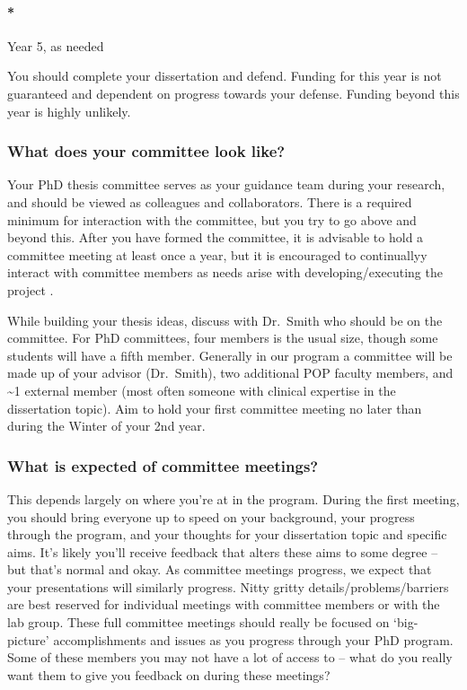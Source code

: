 \documentclass[
  letterpaper,
  DIV=11,
  numbers=noendperiod]{scrreprt}
\let\oldparagraph\paragraph
\renewcommand{\paragraph}[1]{\oldparagraph{#1}\mbox{}}
\begin{document}
\hypertarget{year-5-as-needed}{%
\paragraph*{Year 5, as needed}\label{year-5-as-needed}}

You should complete your dissertation and defend. Funding for this year
is not guaranteed and dependent on progress towards your defense.
Funding beyond this year is highly unlikely.

\hypertarget{what-does-your-committee-look-like}{%
\subsubsection{What does your committee look
like?}\label{what-does-your-committee-look-like}}

Your PhD thesis committee serves as your guidance team during your
research, and should be viewed as colleagues and collaborators. There is
a required minimum for interaction with the committee, but you try to go
above and beyond this. After you have formed the committee, it is
advisable to hold a committee meeting at least once a year, but it is
encouraged to continuallyy interact with committee members as needs
arise with developing/executing the project .

While building your thesis ideas, discuss with Dr.~Smith who should be
on the committee. For PhD committees, four members is the usual size,
though some students will have a fifth member. Generally in our program
a committee will be made up of your advisor (Dr.~Smith), two additional
POP faculty members, and \textasciitilde1 external member (most often
someone with clinical expertise in the dissertation topic). Aim to hold
your first committee meeting no later than during the Winter of your 2nd
year.

\hypertarget{what-is-expected-of-committee-meetings}{%
\subsubsection{What is expected of committee
meetings?}\label{what-is-expected-of-committee-meetings}}

This depends largely on where you're at in the program. During the first
meeting, you should bring everyone up to speed on your background, your
progress through the program, and your thoughts for your dissertation
topic and specific aims. It's likely you'll receive feedback that alters
these aims to some degree -- but that's normal and okay. As committee
meetings progress, we expect that your presentations will similarly
progress. Nitty gritty details/problems/barriers are best reserved for
individual meetings with committee members or with the lab group. These
full committee meetings should really be focused on `big-picture'
accomplishments and issues as you progress through your PhD program.
Some of these members you may not have a lot of access to -- what do you
really want them to give you feedback on during these meetings?
\end{document}
